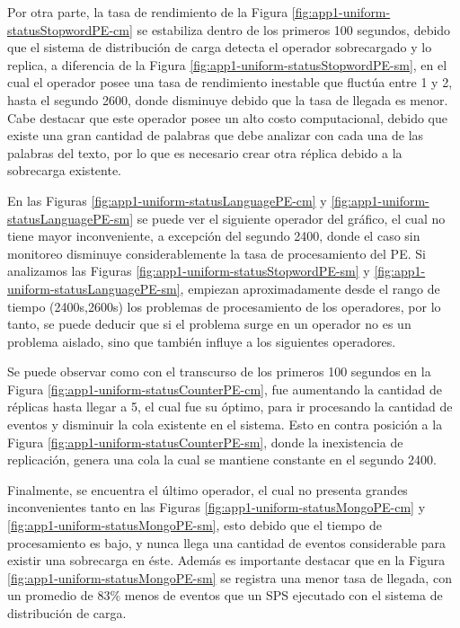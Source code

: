 Por otra parte, la tasa de rendimiento de la Figura \ref{fig:app1-uniform-statusStopwordPE-cm} se estabiliza dentro de los primeros 100 segundos, debido que el sistema de distribución de carga detecta el operador sobrecargado y lo replica, a diferencia de la Figura \ref{fig:app1-uniform-statusStopwordPE-sm}, en el cual el operador posee una tasa de rendimiento inestable que fluctúa entre 1 y 2, hasta el segundo 2600, donde disminuye debido que la tasa de llegada es menor. Cabe destacar que este operador posee un alto costo computacional, debido que existe una gran cantidad de palabras que debe analizar con cada una de las palabras del texto, por lo que es necesario crear otra réplica debido a la sobrecarga existente.

En las Figuras \ref{fig:app1-uniform-statusLanguagePE-cm} y \ref{fig:app1-uniform-statusLanguagePE-sm} se puede ver el siguiente operador del gráfico, el cual no tiene mayor inconveniente, a excepción del segundo 2400, donde el caso sin monitoreo disminuye considerablemente la tasa de procesamiento del PE. Si analizamos las Figuras \ref{fig:app1-uniform-statusStopwordPE-sm} y \ref{fig:app1-uniform-statusLanguagePE-sm}, empiezan aproximadamente desde el rango de tiempo (2400s,2600s) los problemas de procesamiento de los operadores, por lo tanto, se puede deducir que si el problema surge en un operador no es un problema aislado, sino que también influye a los siguientes operadores.

Se puede observar como con el transcurso de los primeros 100 segundos en la Figura \ref{fig:app1-uniform-statusCounterPE-cm}, fue aumentando la cantidad de réplicas hasta llegar a 5, el cual fue su óptimo, para ir procesando la cantidad de eventos y disminuir la cola existente en el sistema. Esto en contra posición a la Figura \ref{fig:app1-uniform-statusCounterPE-sm}, donde la inexistencia de replicación, genera una cola la cual se mantiene constante en el segundo 2400. 

Finalmente, se encuentra el último operador, el cual no presenta grandes inconvenientes tanto en las Figuras \ref{fig:app1-uniform-statusMongoPE-cm} y \ref{fig:app1-uniform-statusMongoPE-sm}, esto debido que el tiempo de procesamiento es bajo, y nunca llega una cantidad de eventos considerable para existir una sobrecarga en éste. Además es importante destacar que en la Figura \ref{fig:app1-uniform-statusMongoPE-sm} se registra una menor tasa de llegada, con un promedio de $83\%$ menos de eventos que un SPS ejecutado con el sistema de distribución de carga.

